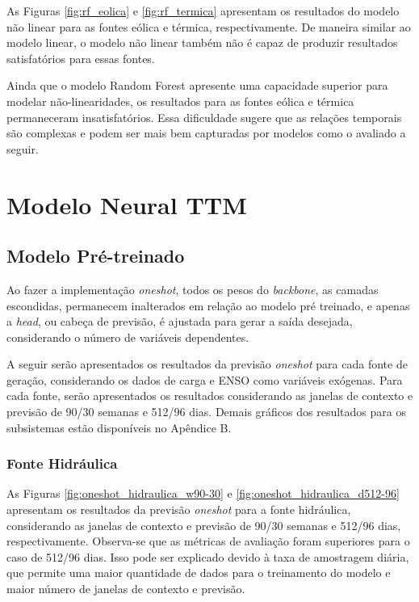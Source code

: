 As Figuras \ref{fig:rf_eolica} e \ref{fig:rf_termica} apresentam os resultados do modelo não linear para as fontes eólica 
e térmica, respectivamente. De maneira similar ao modelo linear, o modelo não linear também não é capaz de produzir resultados
satisfatórios para essas fontes.

Ainda que o modelo Random Forest apresente uma capacidade superior para modelar não-linearidades, os resultados para as 
fontes eólica e térmica permaneceram insatisfatórios. Essa dificuldade sugere que as relações temporais são complexas e 
podem ser mais bem capturadas por modelos como o avaliado a seguir.

\section{Modelo Neural TTM}
\subsection{Modelo Pré-treinado}
Ao fazer a implementação \textit{oneshot}, todos os pesos do \textit{backbone}, as camadas escondidas, permanecem inalterados
em relação ao modelo pré treinado, e apenas a \textit{head}, ou cabeça de previsão, é ajustada para gerar a saída desejada,
considerando o número de variáveis dependentes.

A seguir serão apresentados os resultados da previsão \textit{oneshot} para cada fonte de geração, considerando os dados de carga e ENSO
como variáveis exógenas. Para cada fonte, serão apresentados os resultados considerando as janelas de contexto e previsão
de 90/30 semanas e 512/96 dias. Demais gráficos dos resultados para os subsistemas estão disponíveis no Apêndice B.

\subsubsection{Fonte Hidráulica}
\begin{figure}[!ht]
  {}
  {}
\end{figure}
\begin{figure}[!ht]
  {}
  {}
\end{figure}
As Figuras \ref{fig:oneshot_hidraulica_w90-30} e \ref{fig:oneshot_hidraulica_d512-96} apresentam os resultados da previsão
\textit{oneshot} para a fonte hidráulica, considerando as janelas de contexto e previsão de 90/30 semanas e 512/96 dias, respectivamente.
Observa-se que as métricas de avaliação foram superiores para o caso de 512/96 dias. Isso pode ser explicado devido à
taxa de amostragem diária, que permite uma maior quantidade de dados para o treinamento do modelo e maior número de 
janelas de contexto e previsão.

